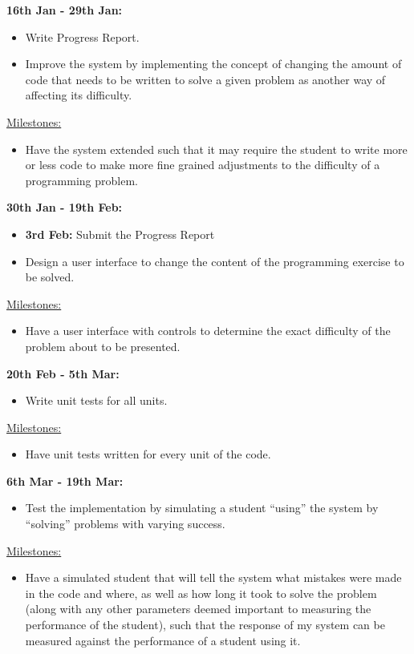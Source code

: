 \documentclass[12pt,a4paper,twoside]{article}
\begin{document}
\textbf{16th Jan - 29th Jan:}
\begin{itemize}
\item{Write Progress Report.}
\item{Improve the system by implementing the concept of changing the amount of code that needs to be written to solve a given problem as another way of affecting its difficulty.}
\end{itemize}
\underline{Milestones:}
\begin{itemize}
\item{Have the system extended such that it may require the student to write more or less code to make more fine grained adjustments to the difficulty of a programming problem.}
\end{itemize}

\textbf{30th Jan - 19th Feb:}
\begin{itemize}
\item{\textbf{3rd Feb:} Submit the Progress Report}
\item{Design a user interface to change the content of the programming exercise to be solved.}
\end{itemize}
\underline{Milestones:}
\begin{itemize}
\item{Have a user interface with controls to determine the exact difficulty of the problem about to be presented.}
\end{itemize}

\textbf{20th Feb - 5th Mar:}
\begin{itemize}
\item{Write unit tests for all units.}
\end{itemize}
\underline{Milestones:}
\begin{itemize}
\item{Have unit tests written for every unit of the code.}
\end{itemize}

\textbf{6th Mar - 19th Mar:}
\begin{itemize}
\item{Test the implementation by simulating a student ``using'' the system by ``solving'' problems with varying success.}
\end{itemize}
\underline{Milestones:}
\begin{itemize}
\item{Have a simulated student that will tell the system what mistakes were made in the code and where, as well as how long it took to solve the problem (along with any other parameters deemed important to measuring the performance of the student), such that the response of my system can be measured against the performance of a student using it.}
\end{itemize}
\end{document}
